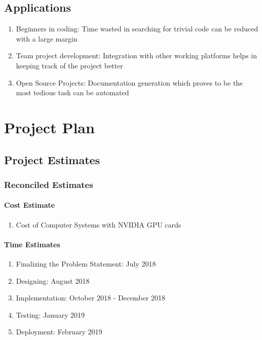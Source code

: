 \documentclass[oneside,a4paper,12pt, times]{book}
\begin{document}
\section{Applications}
\begin{enumerate}
    \item Beginners in coding: Time wasted in searching for trivial code can be reduced with a large margin
    \item Team project development: Integration with other working platforms helps in keeping track of the project better
    \item Open Source Projects: Documentation generation which proves to be the most tedious task can be automated 
\end{enumerate}







\chapter{Project Plan}

\section{Project Estimates}

\subsection{Reconciled Estimates}
\subsubsection{Cost Estimate}
\begin{enumerate}
	\item Cost of Computer Systems with NVIDIA GPU cards

\end{enumerate}

\subsubsection{Time Estimates}
\begin{enumerate}
	\item Finalizing the Problem Statement: July 2018
	\item Designing: August 2018
	\item Implementation: October 2018 - December 2018
	\item Testing: January 2019
	\item Deployment: February 2019
\end{enumerate}
\end{document}
